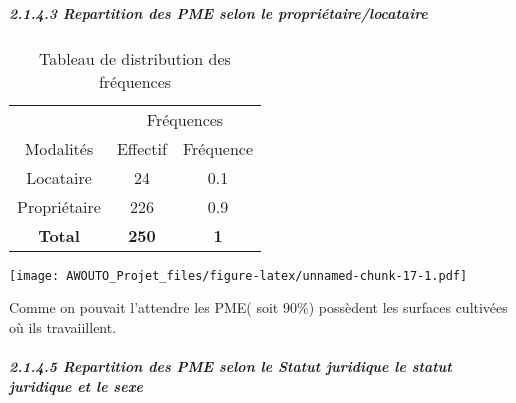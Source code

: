 \documentclass[
]{article}
\newenvironment{Shaded}{\begin{snugshade}}{\end{snugshade}}
\newcommand{\AttributeTok}[1]{\textcolor[rgb]{0.13,0.29,0.53}{#1}}
\newcommand{\FunctionTok}[1]{\textcolor[rgb]{0.13,0.29,0.53}{\textbf{#1}}}
\newcommand{\NormalTok}[1]{#1}
\newcommand{\SpecialCharTok}[1]{\textcolor[rgb]{0.81,0.36,0.00}{\textbf{#1}}}
\newcommand{\StringTok}[1]{\textcolor[rgb]{0.31,0.60,0.02}{#1}}
\begin{document}
\hypertarget{repartition-des-pme-selon-le-propriuxe9tairelocataire}{%
\subparagraph{2.1.4.3 Repartition des PME selon le
propriétaire/locataire}\label{repartition-des-pme-selon-le-propriuxe9tairelocataire}}

\begin{Shaded}
\end{Shaded}

\begin{longtable}[t]{ccc}
\caption{\label{tab:unnamed-chunk-17}Tableau de distribution des fréquences}\\
\toprule
\multicolumn{1}{c}{ } & \multicolumn{2}{c}{Fréquences} \\
\cmidrule(l{3pt}r{3pt}){2-3}
Modalités & Effectif & Fréquence\\
\midrule
Locataire & 24 & 0.1\\
Propriétaire & 226 & 0.9\\
\textbf{Total} & \textbf{250} & \textbf{1}\\
\bottomrule
\end{longtable}

\begin{Shaded}
\end{Shaded}

\texttt{[image: AWOUTO\_Projet\_files/figure-latex/unnamed-chunk-17-1.pdf]}

Comme on pouvait l'attendre les PME( soit 90\%) possèdent les surfaces
cultivées où ils travaiillent.

\hypertarget{repartition-des-pme-selon-le-statut-juridique-le-statut-juridique-et-le-sexe}{%
\subparagraph{2.1.4.5 Repartition des PME selon le Statut juridique le
statut juridique et le
sexe}\label{repartition-des-pme-selon-le-statut-juridique-le-statut-juridique-et-le-sexe}}

\begin{Shaded}
\end{Shaded}
\end{document}
